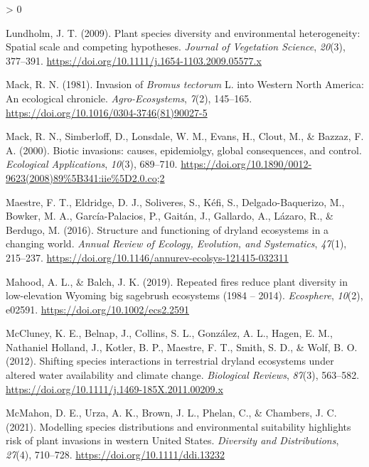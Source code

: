 \documentclass[
  11pt,
  a4paper,
]{article}
\newlength{\cslhangindent}
\newenvironment{CSLReferences}[2] %
 {%
  \setlength{\parindent}{0pt}
  \ifodd #1 \everypar{\setlength{\hangindent}{\cslhangindent}}\ignorespaces\fi
  \ifnum #2 > 0
  \setlength{\parskip}{#2\baselineskip}
  \fi
 }%
 {}
\begin{document}
\begin{CSLReferences}{1}{0}
\leavevmode\hypertarget{ref-Lundholm2009}{}%
Lundholm, J. T. (2009). {Plant species diversity and environmental heterogeneity: Spatial scale and competing hypotheses}. \emph{Journal of Vegetation Science}, \emph{20}(3), 377--391. \url{https://doi.org/10.1111/j.1654-1103.2009.05577.x}

\leavevmode\hypertarget{ref-Mack1981}{}%
Mack, R. N. (1981). {Invasion of \emph{Bromus tectorum} L. into Western North America: An ecological chronicle}. \emph{Agro-Ecosystems}, \emph{7}(2), 145--165. \url{https://doi.org/10.1016/0304-3746(81)90027-5}

\leavevmode\hypertarget{ref-Mack2000}{}%
Mack, R. N., Simberloff, D., Lonsdale, W. M., Evans, H., Clout, M., \& Bazzaz, F. A. (2000). {Biotic invasions: causes, epidemiolgy, global consequences, and control}. \emph{Ecological Applications}, \emph{10}(3), 689--710. \url{https://doi.org/10.1890/0012-9623(2008)89\%5B341:iie\%5D2.0.co;2}

\leavevmode\hypertarget{ref-Maestre2016}{}%
Maestre, F. T., Eldridge, D. J., Soliveres, S., Kéfi, S., Delgado-Baquerizo, M., Bowker, M. A., García-Palacios, P., Gaitán, J., Gallardo, A., Lázaro, R., \& Berdugo, M. (2016). {Structure and functioning of dryland ecosystems in a changing world}. \emph{Annual Review of Ecology, Evolution, and Systematics}, \emph{47}(1), 215--237. \url{https://doi.org/10.1146/annurev-ecolsys-121415-032311}

\leavevmode\hypertarget{ref-Mahood2019}{}%
Mahood, A. L., \& Balch, J. K. (2019). {Repeated fires reduce plant diversity in low-elevation Wyoming big sagebrush ecosystems (1984 -- 2014)}. \emph{Ecosphere}, \emph{10}(2), e02591. \url{https://doi.org/10.1002/ecs2.2591}

\leavevmode\hypertarget{ref-McCluney2012}{}%
McCluney, K. E., Belnap, J., Collins, S. L., González, A. L., Hagen, E. M., Nathaniel Holland, J., Kotler, B. P., Maestre, F. T., Smith, S. D., \& Wolf, B. O. (2012). {Shifting species interactions in terrestrial dryland ecosystems under altered water availability and climate change}. \emph{Biological Reviews}, \emph{87}(3), 563--582. \url{https://doi.org/10.1111/j.1469-185X.2011.00209.x}

\leavevmode\hypertarget{ref-Mcmahon2021}{}%
McMahon, D. E., Urza, A. K., Brown, J. L., Phelan, C., \& Chambers, J. C. (2021). Modelling species distributions and environmental suitability highlights risk of plant invasions in western {United} {States}. \emph{Diversity and Distributions}, \emph{27}(4), 710--728. \url{https://doi.org/10.1111/ddi.13232}


\end{CSLReferences}
\end{document}
